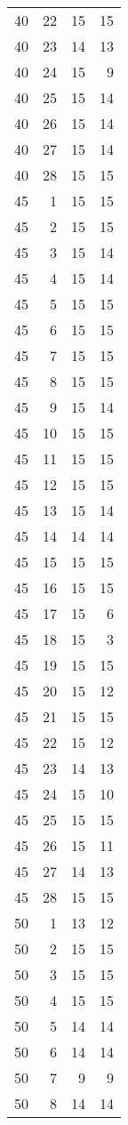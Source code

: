 \documentclass[
]{article}
\begin{document}
\begin{longtable}[]{@{}rrrr@{}}
40 & 22 & 15 & 15 \\
40 & 23 & 14 & 13 \\
40 & 24 & 15 & 9 \\
40 & 25 & 15 & 14 \\
40 & 26 & 15 & 14 \\
40 & 27 & 15 & 14 \\
40 & 28 & 15 & 15 \\
45 & 1 & 15 & 15 \\
45 & 2 & 15 & 15 \\
45 & 3 & 15 & 14 \\
45 & 4 & 15 & 14 \\
45 & 5 & 15 & 15 \\
45 & 6 & 15 & 15 \\
45 & 7 & 15 & 15 \\
45 & 8 & 15 & 15 \\
45 & 9 & 15 & 14 \\
45 & 10 & 15 & 15 \\
45 & 11 & 15 & 15 \\
45 & 12 & 15 & 15 \\
45 & 13 & 15 & 14 \\
45 & 14 & 14 & 14 \\
45 & 15 & 15 & 15 \\
45 & 16 & 15 & 15 \\
45 & 17 & 15 & 6 \\
45 & 18 & 15 & 3 \\
45 & 19 & 15 & 15 \\
45 & 20 & 15 & 12 \\
45 & 21 & 15 & 15 \\
45 & 22 & 15 & 12 \\
45 & 23 & 14 & 13 \\
45 & 24 & 15 & 10 \\
45 & 25 & 15 & 15 \\
45 & 26 & 15 & 11 \\
45 & 27 & 14 & 13 \\
45 & 28 & 15 & 15 \\
50 & 1 & 13 & 12 \\
50 & 2 & 15 & 15 \\
50 & 3 & 15 & 15 \\
50 & 4 & 15 & 15 \\
50 & 5 & 14 & 14 \\
50 & 6 & 14 & 14 \\
50 & 7 & 9 & 9 \\
50 & 8 & 14 & 14 \\

\end{longtable}
\end{document}
